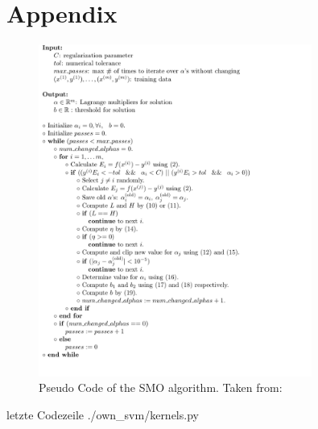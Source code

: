 \section{Appendix}
\begin{figure}
  \centering
    \includegraphics[width=0.8\textwidth]{media_saved/pseudo_code}
  \caption{Pseudo Code of the SMO algorithm. Taken from: \cite{smo}}
  \label{fig:gull}
\end{figure}

 letzte Codezeile
{./own_svm/kernels.py}

\newpage
\printbibliography %
        